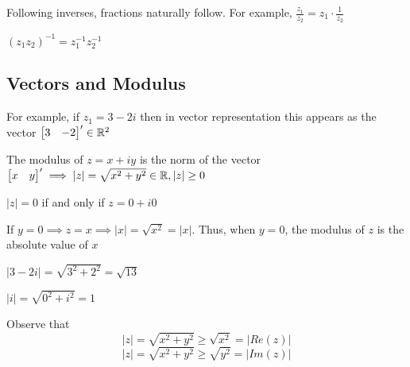 \documentclass[12pt]{scrartcl}
\begin{document}
\begin{definition}[Fraction]
  Following inverses, fractions naturally follow. For example, $\frac{z_1}{z_2} = z_1 \cdot \frac{1}{z_2}$
\end{definition}

\begin{definition}[Projection] $(z_1z_2)^{-1} = z_1^{-1}z_2^{-1}$
\end{definition}

\subsection{Vectors and Modulus}

\begin{definition}
  For example, if $z_1 = 3 - 2i$ then in vector representation this appears as the vector 
  $\begin{bmatrix}
    3 & -2
  \end{bmatrix}' \in \mathbb R^2$
\end{definition}

\begin{definition}[Modulus]
  The modulus of $z = x + iy$ is the norm of the vector $\begin{bmatrix}
    x & y
  \end{bmatrix}' \implies |z| = \sqrt{x^2 + y^2} \in \mathbb R, |z| \geq 0$
\end{definition}

\begin{note}
  $|z| = 0$ if and only if $z = 0 + i0$
\end{note}

\begin{note}
  If $y = 0 \implies z = x \implies |x| = \sqrt{x^2} = |x|$. Thus, when $y=0$, the modulus of $z$ is the absolute value of $x$
\end{note}

\begin{example}
  $|3-2i| = \sqrt{3^2 + 2^2} = \sqrt{13}$
\end{example}

\begin{example}
  $|i| = \sqrt{0^2 + i^2} = 1$
\end{example}

\begin{remark}
  Observe that 
  \[|z| = \sqrt{x^2 + y^2} \geq \sqrt{x^2} = |Re(z)|\]
  \[|z| = \sqrt{x^2 + y^2} \geq \sqrt{y^2} = |Im(z)|\]
\end{remark}
\end{document}
